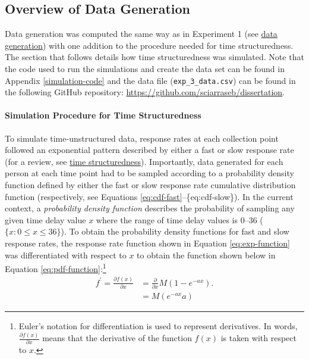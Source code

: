 \documentclass[
12pt, %
twoside,
english]{guelphthesis}
\begin{document}
\hypertarget{overview-of-data-generation-1}{%
\subsection{Overview of Data Generation}\label{overview-of-data-generation-1}}

Data generation was computed the same way as in Experiment 1 (see \protect\hyperlink{data-generation}{data generation}) with one addition to the procedure needed for time structuredness. The section that follows details how time structuredness was simulated. Note that the code used to run the simulations and create the data set can be found in Appendix \ref{simulation-code} and the data file (\texttt{exp\_3\_data.csv}) can be found in the following GitHub repository: \url{https://github.com/sciarraseb/dissertation}.

\hypertarget{simulating-time-struc}{%
\paragraph{Simulation Procedure for Time Structuredness}\label{simulating-time-struc}}

To simulate time-unstructured data, response rates at each collection
point followed an exponential pattern described by either a fast or slow
response rate (for a review, see \protect\hyperlink{time-structuredness}{time structuredness}). Importantly, data generated
for each person at each time point had to be sampled according to a
probability density function defined by either the fast or slow response
rate cumulative distribution function (respectively, see Equations \ref{eq:cdf-fast}--\{eq:cdf-slow\}). In the current context, a
\emph{probability density function} describes the probability of sampling
any given time delay value \(x\) where the range of time delay values is
0--36 (\(\{x : 0 \le x \le 36 \}\)). To obtain the probability density functions
for fast and slow response rates, the response rate function shown in
Equation \eqref{eq:exp-function} was differentiated with respect to \(x\) to
obtain the function shown below in Equation \ref{eq:pdf-function}:\footnote{Euler's notation for differentiation is used to represent derivatives. In words, $\frac{\partial f(x)}{\partial x}$ means that the derivative of the function $f(x)$ is taken with respect to $x$.}
\begin{align}
f^\prime = \frac{\partial f(x)}{\partial x} &= \frac{\partial}{\partial x}M(1 - e^{-ax}). \nonumber \\
&= M (e^{-ax}a)
\label{eq:pdf-function}
\end {align}
\end{document}
